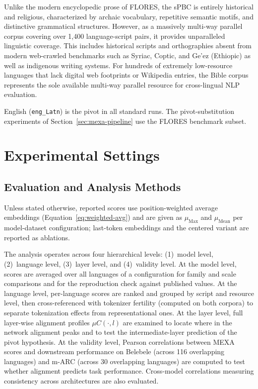 Unlike the modern encyclopedic prose of FLORES, the sPBC is entirely historical and religious, characterized by archaic vocabulary, repetitive semantic motifs, and distinctive grammatical structures. However, as a massively multi-way parallel corpus covering over 1{,}400 language-script pairs, it provides unparalleled linguistic coverage. This includes historical scripts and orthographies absent from modern web-crawled benchmarks such as Syriac, Coptic, and Ge'ez (Ethiopic) as well as indigenous writing systems. For hundreds of extremely low-resource languages that lack digital web footprints or Wikipedia entries, the Bible corpus represents the sole available multi-way parallel resource for cross-lingual NLP evaluation.

English (\texttt{eng\_Latn}) is the pivot in all standard runs. The pivot-substitution experiments of Section~\ref{sec:mexa-pipeline} use the FLORES benchmark subset.

\section{Experimental Settings}
\label{sec:experimental-settings}

\subsection{Evaluation and Analysis Methods}
\label{subsec:analysis-methods}

Unless stated otherwise, reported scores use position-weighted average embeddings (Equation~\eqref{eq:weighted-avg}) and are given as $\mu_{\text{Max}}$ and $\mu_{\text{Mean}}$ per model-dataset configuration; last-token embeddings and the centered variant are reported as ablations.

The analysis operates across four hierarchical levels: (1)~model level, (2)~language level, (3)~layer level, and (4)~validity level. At the model level, scores are averaged over all languages of a configuration for family and scale comparisons and for the reproduction check against published values. At the language level, per-language scores are ranked and grouped by script and resource level, then cross-referenced with tokenizer fertility (computed on both corpora) to separate tokenization effects from representational ones. At the layer level, full layer-wise alignment profiles $\mu C(\cdot, l)$ are examined to locate where in the network alignment peaks and to test the intermediate-layer prediction of the pivot hypothesis. At the validity level, Pearson correlations between MEXA scores and downstream performance on Belebele \citep{bandarkar2024belebele} (across 116 overlapping languages) and m-ARC \citep{lai2023okapi} (across 30 overlapping languages) are computed to test whether alignment predicts task performance. Cross-model correlations measuring consistency across architectures are also evaluated.

